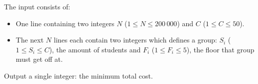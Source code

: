 \begin{Input}
    The input consists of:
    \begin{itemize}
        \item One line containing two integers $N$ ($1 \leq N \leq 200\,000$) and
        $C$ ($1 \leq C \leq 50$).
        \item The next $N$ lines each contain two integers which defines a group: $S_i$ ($1 \leq S_i \leq C$), the amount of students and $F_i$ ($1 \leq F_i \leq 5$), the floor that group must get off at.
    \end{itemize}
\end{Input}

\begin{Output}
    Output a single integer: the minimum total cost.
\end{Output}
